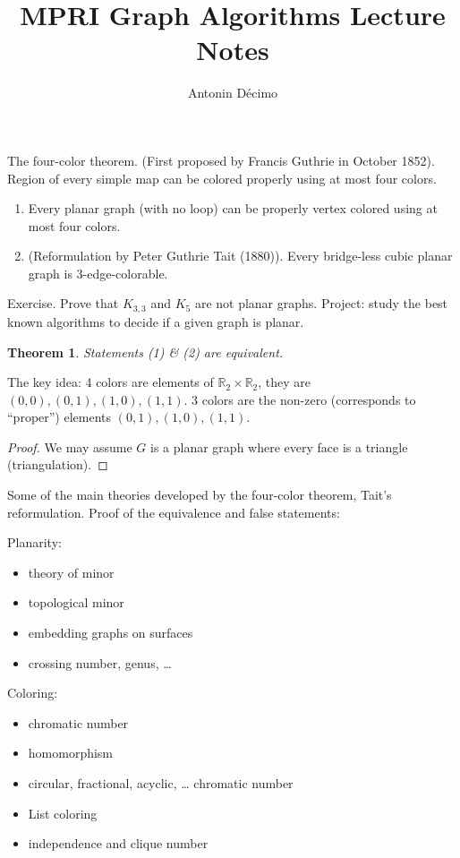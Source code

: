 \documentclass[12pt,a4paper]{article}
\title{MPRI Graph Algorithms Lecture Notes}
\author{Antonin Décimo}
\def\Z{\mathbb{R}}
\newtheorem{theorem}{Theorem}
\begin{document}
\maketitle

The four-color theorem. (First proposed by Francis Guthrie in October 1852).
Region of every simple map can be colored properly using at most four colors.

\begin{enumerate}
\item Every planar graph (with no loop) can be properly vertex colored using at
most four colors.
\item (Reformulation by Peter Guthrie Tait (1880)). Every bridge-less cubic
  planar graph is 3-edge-colorable.
\end{enumerate}

Exercise. Prove that \(K_{3,3}\) and \(K_5\) are not planar graphs.  Project:
study the best known algorithms to decide if a given graph is planar.

\begin{theorem}
  Statements (1) \& (2) are equivalent.
\end{theorem}

The key idea: 4 colors are elements of \(\Z_2 \times \Z_2\), they are
\((0, 0), (0, 1), (1, 0), (1, 1)\).  3 colors are the non-zero (corresponds to
\enquote{proper}) elements \((0, 1), (1, 0), (1, 1)\).

\begin{proof}
  We may assume \(G\) is a planar graph where every face is a triangle
  (triangulation).
\end{proof}

Some of the main theories developed by the four-color theorem, Tait's
reformulation. Proof of the equivalence and false statements:

Planarity:
\begin{itemize}
\item theory of minor
\item topological minor
\item embedding graphs on surfaces
\item crossing number, genus, …
\end{itemize}

Coloring:
\begin{itemize}
\item chromatic number
\item homomorphism
\item circular, fractional, acyclic, … chromatic number
\item List coloring
\item independence and clique number
\end{itemize}
\end{document}
